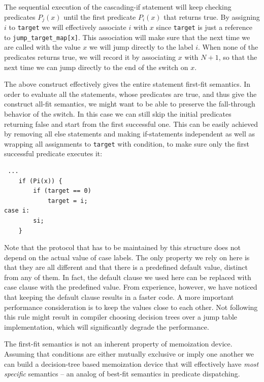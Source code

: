 \documentclass[preprint]{sigplanconf}
\makeatletter
\DeclareRobustCommand{\code}[1]{{\lstinline[breaklines=false,escapechar=@]{#1}}}
\makeatother
\begin{document}
The sequential execution of the cascading-if statement will keep checking 
predicates $P_j(x)$ until the first predicate $P_i(x)$ that returns true. By 
assigning $i$ to \code{target} we will effectively associate $i$ with $x$ since 
\code{target} is just a reference to \code{jump_target_map[x]}. This association 
will make sure that the next time we are called with the value $x$ we will jump 
directly to the label $i$. When none of the predicates returns true, we will 
record it by associating $x$ with $N+1$, so that the next time we can jump 
directly to the end of the switch on $x$. 

The above construct effectively gives the entire statement first-fit semantics. 
In order to evaluate all the statements, whose predicates are true, and thus 
give the construct all-fit semantics, we might want to be able to preserve the 
fall-through behavior of the switch. In this case we can still skip the initial 
predicates returning false and start from the first successful one. This can be 
easily achieved by removing all else statements and making if-statements 
independent as well as wrapping all assignments to \code{target} with condition, 
to make sure only the first successful predicate executes it:

\begin{lstlisting}
 ...
    if (Pi(x)) { 
        if (target == 0)
            target = i;
case i:
        si;
    }
\end{lstlisting}

Note that the protocol that has to be maintained by this structure does not 
depend on the actual value of case labels. The only property we rely on here is 
that they are all different and that there is a predefined default value, 
distinct from any of them. In fact, the default clause we used here can be 
replaced with case clause with the predefined value. From experience, however, 
we have noticed that keeping the default clause results in a faster code. A more 
important performance consideration is to keep the values close to each other. 
Not following this rule might result in compiler choosing decision trees over a 
jump table implementation, which will significantly degrade the performance.

The first-fit semantics is not an inherent property of memoization device. 
Assuming that conditions are either mutually exclusive or imply one another we 
can build a decision-tree based memoization device that will effectively have 
\emph{most specific} semantics -- an analog of best-fit semantics in predicate 
dispatching\cite{ErnstKC98}.
\end{document}
